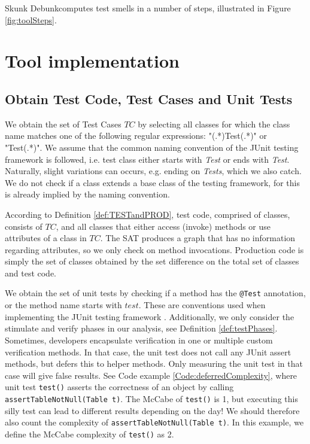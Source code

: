 \documentclass{uvamscse}
\newcommand{\toolName}{Skunk Debunk}
\begin{document}
\toolName computes test smells in a number of steps, illustrated in Figure \ref{fig:toolSteps}.  

\section{Tool implementation}

\subsection{Obtain Test Code, Test Cases and Unit Tests}
We obtain the set of Test Cases $TC$ by selecting all classes for which the class name matches one of the following regular expressions: "(.*)Test(.*)" or "Test(.*)". We assume that the common naming convention of the JUnit testing framework is followed, i.e. test class either starts with \emph{Test} or ends with \emph{Test}. Naturally, slight variations can occurs, e.g. ending on \emph{Tests}, which we also catch. We do not check if a class extends a base class of the testing framework, for this is already implied by the naming convention. 

According to Definition \ref{def:TESTandPROD}, test code, comprised of classes, consists of $TC$, and all classes that either access (invoke) methods or use attributes of a class in $TC$. The SAT produces a graph that has no information regarding attributes, so we only check on method invocations. Production code is simply the set of classes obtained by the set difference on the total set of classes and test code.

We obtain the set of unit tests by checking if a method has the \texttt{@Test} annotation, or the method name starts with $test$. These are conventions used when implementing the JUnit testing framework . Additionally, we only consider the stimulate and verify phases in our analysis, see Definition \ref{def:testPhases}. Sometimes, developers encapsulate verification in one or multiple custom verification methods. In that case, the unit test does not call any JUnit assert methods, but defers this to helper methods. Only measuring the unit test in that case will give false results. See Code example \ref{Code:deferredComplexity}, where unit test \texttt{test()} asserts the correctness of an object by calling \texttt{assertTableNotNull(Table t)}. The McCabe of \texttt{test()} is 1, but executing this silly test can lead to different results depending on the day! We should therefore also count the complexity of \texttt{assertTableNotNull(Table t)}. In this example, we define the McCabe complexity of \texttt{test()} as 2.
\end{document}

